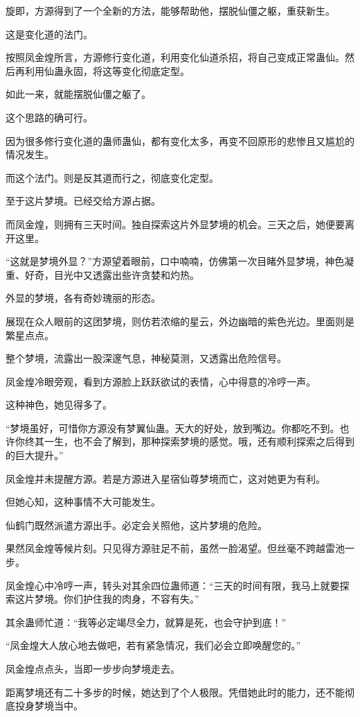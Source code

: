 \begin{this_body}
旋即，方源得到了一个全新的方法，能够帮助他，摆脱仙僵之躯，重获新生。

这是变化道的法门。

按照凤金煌所言，方源修行变化道，利用变化仙道杀招，将自己变成正常蛊仙。然后再利用仙蛊永固，将这等变化彻底定型。

如此一来，就能摆脱仙僵之躯了。

这个思路的确可行。

因为很多修行变化道的蛊师蛊仙，都有变化太多，再变不回原形的悲惨且又尴尬的情况发生。

而这个法门。则是反其道而行之，彻底变化定型。

至于这片梦境。已经交给方源占据。

而凤金煌，则拥有三天时间。独自探索这片外显梦境的机会。三天之后，她便要离开这里。

“这就是梦境外显？”方源望着眼前，口中喃喃，仿佛第一次目睹外显梦境，神色凝重、好奇，目光中又透露出些许贪婪和灼热。

外显的梦境，各有奇妙瑰丽的形态。

展现在众人眼前的这团梦境，则仿若浓缩的星云，外边幽暗的紫色光边。里面则是繁星点点。

整个梦境，流露出一股深邃气息，神秘莫测，又透露出危险信号。

凤金煌冷眼旁观，看到方源脸上跃跃欲试的表情，心中得意的冷哼一声。

这种神色，她见得多了。

“梦境虽好，可惜你方源没有梦翼仙蛊。天大的好处，放到嘴边。你都吃不到。也许你终其一生，也不会了解到，那种探索梦境的感觉。哦，还有顺利探索之后得到的巨大提升。”

凤金煌并未提醒方源。若是方源进入星宿仙尊梦境而亡，这对她更为有利。

但她心知，这种事情不大可能发生。

仙鹤门既然派遣方源出手。必定会关照他，这片梦境的危险。

果然凤金煌等候片刻。只见得方源驻足不前，虽然一脸渴望。但丝毫不跨越雷池一步。

凤金煌心中冷哼一声，转头对其余四位蛊师道：“三天的时间有限，我马上就要探索这片梦境。你们护住我的肉身，不容有失。”

其余蛊师忙道：“我等必定竭尽全力，就算是死，也会守护到底！”

“凤金煌大人放心地去做吧，若有紧急情况，我们必会立即唤醒您的。”

凤金煌点点头，当即一步步向梦境走去。

距离梦境还有二十多步的时候，她达到了个人极限。凭借她此时的能力，还不能彻底投身梦境当中。


\end{this_body}
